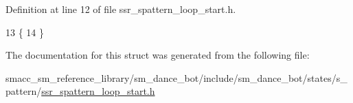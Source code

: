Definition at line 12 of file ssr\+\_\+spattern\+\_\+loop\+\_\+start.\+h.


\begin{DoxyCode}
13   \{
14   \}
\end{DoxyCode}


The documentation for this struct was generated from the following file\+:\begin{DoxyCompactItemize}
\item 
smacc\+\_\+sm\+\_\+reference\+\_\+library/sm\+\_\+dance\+\_\+bot/include/sm\+\_\+dance\+\_\+bot/states/s\+\_\+pattern/\hyperlink{ssr__spattern__loop__start_8h}{ssr\+\_\+spattern\+\_\+loop\+\_\+start.\+h}\end{DoxyCompactItemize}
